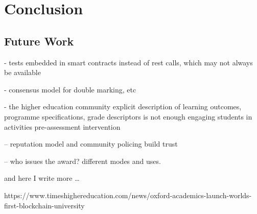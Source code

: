 \chapter{Conclusion}

\section{Future Work}

- tests embedded in smart contracts instead of rest calls, which may not always be available

- consensus model for double marking, etc

- the higher education community explicit description of learning outcomes, programme specifications, grade descriptors is not enough
engaging students in activities pre-assessment intervention \citep{bryan2006innovative}

-- reputation model and community policing build trust

-- who issues the award? different modes and uses. 

and here I write more \dots

https://www.timeshighereducation.com/news/oxford-academics-launch-worlds-first-blockchain-university